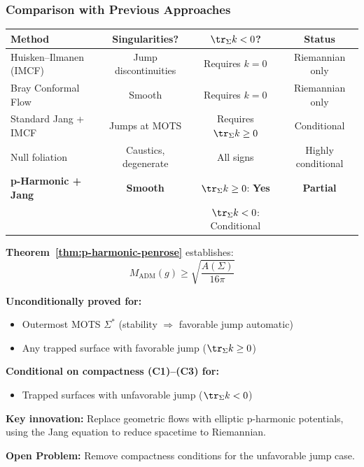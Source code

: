 \subsubsection{Comparison with Previous Approaches}

\begin{center}
\renewcommand{\arraystretch}{1.3}
\begin{tabular}{|l|c|c|c|}
\hline
\textbf{Method} & \textbf{Singularities?} & \textbf{$\tr_\Sigma k < 0$?} & \textbf{Status} \\
\hline
Huisken--Ilmanen (IMCF) & Jump discontinuities & Requires $k = 0$ & Riemannian only \\
Bray Conformal Flow & Smooth & Requires $k = 0$ & Riemannian only \\
Standard Jang + IMCF & Jumps at MOTS & Requires $\tr_\Sigma k \geq 0$ & Conditional \\
Null foliation & Caustics, degenerate & All signs & Highly conditional \\
\hline
\textbf{p-Harmonic + Jang} & \textbf{Smooth} & $\tr_\Sigma k \geq 0$: \textbf{Yes} & \textbf{Partial} \\
& & $\tr_\Sigma k < 0$: Conditional & \\
\hline
\end{tabular}
\end{center}

\begin{remark}
\textbf{Theorem~\ref{thm:p-harmonic-penrose}} establishes:
\begin{equation}
\boxed{M_{\mathrm{ADM}}(g) \geq \sqrt{\frac{A(\Sigma)}{16\pi}}}
\end{equation}

\textbf{Unconditionally proved for:}
\begin{itemize}
\item[$\checkmark$] Outermost MOTS $\Sigma^*$ (stability $\Rightarrow$ favorable jump automatic)
\item[$\checkmark$] Any trapped surface with favorable jump ($\tr_\Sigma k \geq 0$)
\end{itemize}

\textbf{Conditional on compactness (C1)--(C3) for:}
\begin{itemize}
\item[$\times$] Trapped surfaces with unfavorable jump ($\tr_\Sigma k < 0$)
\end{itemize}

\textbf{Key innovation:} Replace geometric flows with elliptic p-harmonic potentials, using the Jang equation to reduce spacetime to Riemannian.

\textbf{Open Problem:} Remove compactness conditions for the unfavorable jump case.
\end{remark}


